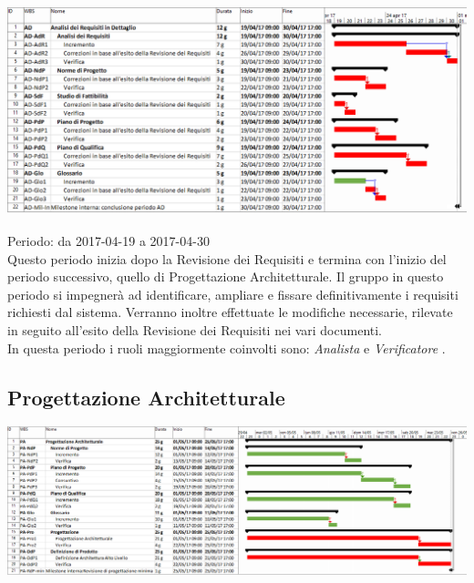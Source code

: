 \begin{center}
  \includegraphics[scale=0.3]{img/2-AD.png}
\end{center}

Periodo: da 2017-04-19 a 2017-04-30 \\
Questo periodo inizia dopo la Revisione dei Requisiti e termina con l’inizio del periodo
successivo, quello di Progettazione Architetturale.
Il gruppo in questo periodo si impegnerà ad identificare, ampliare e fissare definitivamente i requisiti richiesti dal sistema.
Verranno inoltre effettuate le modifiche necessarie, rilevate in seguito all’esito della Revisione dei Requisiti nei vari documenti. \\
In questa periodo i ruoli maggiormente coinvolti sono:  \emph{Analista}  e  \emph{Verificatore} .

\subsection{Progettazione Architetturale}

\begin{center}
  \includegraphics[scale=0.25]{img/3-PA.png}
\end{center}

